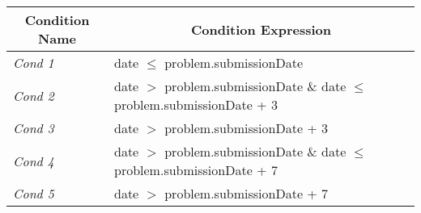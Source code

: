 \documentclass{article}
\begin{document}
\begin{enumerate}
\begin{center}
\begin{scriptsize}
\begin{tabular}{|l|l|} \hline
\multicolumn{1}{|c}{\bf Condition Name} & \multicolumn{1}{|c|}{\bf Condition Expression} \\ \hline
{\em Cond 1} & \textsf{date} $\leq$ \textsf{problem.submissionDate} \\ \hline
{\em Cond 2} & \textsf{date} $>$ \textsf{problem.submissionDate} \& \textsf{date} $\leq$ \textsf{problem.submissionDate} + 3 \\ \hline
{\em Cond 3} & \textsf{date} $>$ \textsf{problem.submissionDate} + 3 \\ \hline
{\em Cond 4} & \textsf{date} $>$ \textsf{problem.submissionDate} \& \textsf{date} $\leq$ \textsf{problem.submissionDate} + 7 \\ \hline
{\em Cond 5} & \textsf{date} $>$ \textsf{problem.submissionDate} + 7 \\ \hline
\end{tabular}
\end{scriptsize}
\end{center}


\end{enumerate}
\end{document}
